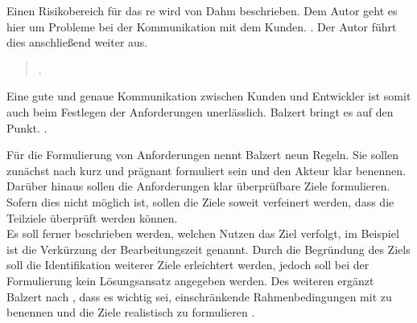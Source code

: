 Einen Risikobereich für das \ac{re} wird von Dahm beschrieben. Dem Autor geht es hier um Probleme bei der Kommunikation mit dem Kunden.  \citep[][S. 174 f.]{Dahme2000}.
Der Autor führt dies anschließend weiter aus. 

	\blockquote{ \citep[][175]{Dahme2000}.}

Eine gute und genaue Kommunikation zwischen Kunden und Entwickler ist somit auch beim Festlegen der Anforderungen unerlässlich. 
Balzert bringt es auf den Punkt. 
 \citep[][455]{Balzert2010}.

Für die Formulierung von Anforderungen nennt Balzert neun Regeln. Sie sollen zunächst nach \cite[][S. 100 ff.]{Pohl2007} kurz und prägnant formuliert sein und den Akteur klar benennen. Darüber hinaus sollen die Anforderungen klar überprüfbare Ziele formulieren. Sofern dies nicht möglich ist, sollen die Ziele soweit verfeinert werden, dass die Teilziele überprüft werden können. \\
Es soll ferner beschrieben werden, welchen Nutzen das Ziel verfolgt, im Beispiel ist die Verkürzung der Bearbeitungszeit genannt. Durch die Begründung des Ziels soll die Identifikation weiterer Ziele erleichtert werden, jedoch soll bei der Formulierung kein Lösungsansatz angegeben werden. Des weiteren ergänzt Balzert nach \cite[][S. 100 f.]{Rupp2007}, dass es wichtig sei, einschränkende Rahmenbedingungen mit zu benennen und die Ziele realistisch zu formulieren \citep[vgl.][S. 457 ff.]{Balzert2010}.


